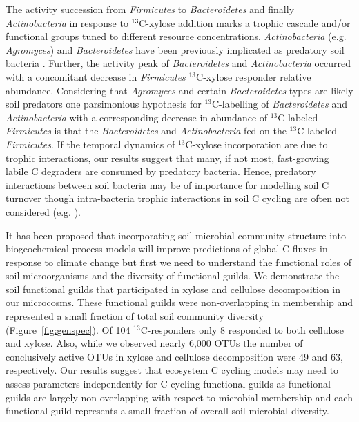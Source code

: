 The activity succession from \textit{Firmicutes} to \textit{Bacteroidetes} and
finally \textit{Actinobacteria} in response to $^{13}$C-xylose addition marks
a trophic cascade and/or functional groups tuned to different resource
concentrations. \textit{Actinobacteria} (e.g. \textit{Agromyces}) and
\textit{Bacteroidetes} have been previously implicated as predatory soil
bacteria \citep{Lueders2006}. Further, the activity peak of
\textit{Bacteroidetes} and \textit{Actinobacteria} occurred with a concomitant
decrease in \textit{Firmicutes} $^{13}$C-xylose responder relative abundance.
Considering that \textit{Agromyces} and certain \textit{Bacteroidetes} types
are likely soil predators \citep{Lueders2006,16346402} one parsimonious
hypothesis for $^{13}$C-labelling of \textit{Bacteroidetes} and
\textit{Actinobacteria} with a corresponding decrease in abundance of
$^{13}$C-labeled \textit{Firmicutes} is that the \textit{Bacteroidetes} and
\textit{Actinobacteria} fed on the $^{13}$C-labeled \textit{Firmicutes}. If the
temporal dynamics of $^{13}$C-xylose incorporation are due to trophic
interactions, our results suggest that many, if not most, fast-growing labile
C degraders are consumed by predatory bacteria. Hence, predatory interactions
between soil bacteria may be of importance for modelling soil C turnover though
intra-bacteria trophic interactions in soil C cycling are often not considered
(e.g. \citep{Moore1988}).

It has been proposed that incorporating soil microbial community structure
into biogeochemical process models will improve predictions of global
C fluxes in response to climate change \citep{McGuire2010} but first we need to
understand the functional roles of soil microorganisms and the diversity of
functional guilds. We demonstrate the soil functional guilds that
participated in xylose and cellulose decomposition in our microcosms. These
functional guilds were non-overlapping in membership and represented a small
fraction of total soil community diversity (Figure~\ref{fig:genspec}). Of
104 $^{13}$C-responders only 8 responded to both cellulose and xylose.
Also, while we observed nearly 6,000 OTUs the number of conclusively active
OTUs in xylose and cellulose decomposition were 49 and 63, respectively. Our
results suggest that ecosystem C cycling models may need to assess parameters
independently for C-cycling functional guilds as functional guilds are largely
non-overlapping with respect to microbial membership and each functional guild
represents a small fraction of overall soil microbial diversity.

